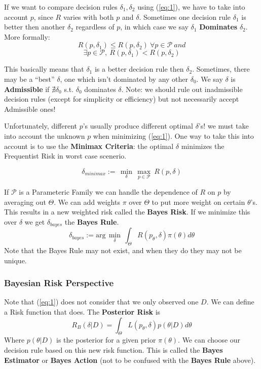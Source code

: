 \documentclass[]{article}
\theoremstyle{mattstyle}
\theoremstyle{definition}
\begin{document}
If we want to compare decision rules \(\delta_1, \delta_2\) using (\ref{eq:1}), we have to take into account \(p\), since \(R\) varies with both \(p\) and \(\delta\). Sometimes one decision rule \(\delta_1\) is better then another \(\delta_2\) regardless of \(p\), in which case we say \(\delta_1\) \textbf{Dominates} \(\delta_2\).
More formally:
$$R(p,\delta_1)\leq R(p,\delta_2) \ \forall p \in \mathcal{P}\ and$$
$$\exists p \in \mathcal{P},\ R(p,\delta_1) < R(p, \delta_2)$$

This basically means that \(\delta_1\) is a better decision rule then \(\delta_2\). Sometimes, there may be a ``best'' \(\delta\), one which isn't dominated by any other \(\delta_0\). We say \(\delta\) is \textbf{Admissible} if $\nexists \delta_0$ s.t. $\delta_0$ dominates $\delta$. Note: we should rule out inadmissible decision rules (except for simplicity or efficiency) but not necessarily accept Admissible ones!

Unfortunately, different \(p\)'s usually produce different optimal \(\delta\)'s! we must take into account the unknown \(p\) when minimizing (\ref{eq:1}). One way to take this into account is to use the \textbf{Minimax Criteria}: the optimal \(\delta\) minimizes the Frequentist Risk in worst case scenerio.

\begin{equation}\delta_{minimax} := \,\min\limits_{\delta}\,\max\limits_{p \in \mathcal{P}}\ R(p,\delta)
\end{equation}

If \(\mathcal{P}\) is a Parameteric Family we can handle the dependence of \(R\) on \(p\) by averaging out \(\Theta\). We can add weights \(\pi\) over $\Theta$ to put more weight on certain $\theta$'s. This results in a new weighted risk called the \textbf{Bayes Risk}. If we minimize this over \(\delta\) we get $\delta_{bayes}$ the \textbf{Bayes Rule}.
\begin{equation}\label{eq:3}
\delta_{bayes}:= \text{arg}\,\min\limits_{\delta}\,\int_{\Theta}^{}R(p_\theta,\delta)\pi(\theta)d\theta
\end{equation}
Note that the Bayes Rule may not exist, and when they do they may not be unique. 

\subsubsection{Bayesian Risk Perspective} 

Note that (\ref{eq:1}) does not consider that we only observed one \(D\). We can define a Risk function that does. The \textbf{Posterior Risk} is
\begin{equation}\label{eq:2}R_B(\delta|D) = \int_{\Theta}^{}L(p_{\theta},\delta)p(\theta|D)d\theta
\end{equation}
Where $p(\theta|D)$ is the posterior for a given prior $\pi(\theta)$. We can choose our decision rule based on this new risk function. This is called the \textbf{Bayes Estimator} or \textbf{Bayes Action} (not to be confused with the \textbf{Bayes Rule} above).
\end{document}

